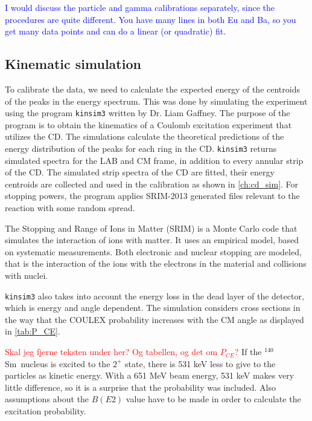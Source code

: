 \documentclass[twoside,english]{uiofysmaster/uiofysmaster}
\newcommand{\Sm}{$^{140}$Sm} %
\let\orgautoref\autoref
\renewcommand{\autoref}
        {%
		 \def\sectionautorefname{Section}%
		 \def\subsectionautorefname{Section}%
		 \def\subsubsectionautorefname{Section}%
		 \def\chapterautorefname{Chapter}%
          \orgautoref}
\begin{document}
\textcolor{blue}{I would discuss the particle and gamma calibrations separately, since the procedures are quite different. You have many lines in both Eu and Ba, so you get many data points and can do a linear (or quadratic) fit.}





\subsection{Kinematic simulation}\label{ssec:kinsim}
To calibrate the data, we need to calculate the expected energy of the centroids of the peaks in the energy spectrum. 
This was done by simulating the experiment using the program \texttt{kinsim3} \cite{kinsim} written by Dr. Liam Gaffney. 
The purpose of the program is to obtain the kinematics of a Coulomb excitation experiment that utilizes the CD. 
The simulations calculate the theoretical predictions of the energy distribution of the peaks for each ring in the CD. 
\texttt{kinsim3} returns simulated spectra for the LAB and CM frame, in addition to every annular strip of the CD.
The simulated strip spectra of the CD are fitted, their energy centroids are collected and used in the calibration as shown in \autoref{ch:cd_sim}.
For stopping powers, the program applies SRIM-2013 \cite{SRIM} generated files relevant to the reaction with some random spread.

The Stopping and Range of Ions in Matter (SRIM) is a Monte Carlo code that simulates the interaction of ions with matter.
It uses an empirical model, based on systematic measurements. 
Both electronic and nuclear stopping are modeled, that is the interaction of the ions with the electrons in the material and collisions with nuclei.

\texttt{kinsim3} also takes into account the energy loss in the dead layer of the detector, which is energy and angle dependent. 
The simulation considers cross sections in the way that the COULEX probability increases with the CM angle as displayed in \autoref{tab:P_CE}.

\textcolor{red}{Skal jeg fjerne teksten under her? Og tabellen, og det om $P_{CE}$?}\newline
If the \Sm\ nucleus is excited to the $2^+$ state, there is 531 keV less to give to the particles as kinetic energy. With a 651 MeV beam energy, 531 keV makes very little difference, so it is a surprise that the probability was included. 
Also assumptions about the $B(E2)$ value have to be made in order to calculate the excitation probability.
\end{document}
